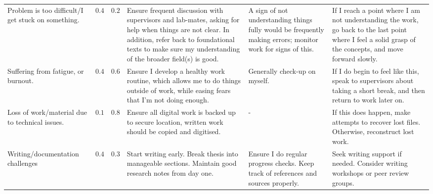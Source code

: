 \begin{table}[!ht]
\begin{tabularx}{\linewidth}{>{\justifying\arraybackslash}X>{\centering\arraybackslash}p{2cm}>{\centering\arraybackslash}p{2cm}>{\justifying\arraybackslash}X>{\justifying\arraybackslash}X>{\justifying\arraybackslash}X}
        Problem is too difficult/I get stuck on something.                                                                & $0.4$                & $0.2$           & Ensure frequent discussion with supervisors and lab-mates, asking for help when things are not clear. In addition, refer back to foundational texts to make sure my understanding of the broader field(s) is good. & A sign of not understanding things fully would be frequently making errors; monitor work for signs of this. & If I reach a point where I am not understanding the work, go back to the last point where I feel a solid grasp of the concepts, and move forward slowly.                             \\
        Suffering from fatigue, or burnout.                                                                               & $0.4$                & $0.6$           & Ensure I develop a healthy work routine, which allows me to do things outside of work, while easing fears that I'm not doing enough.                                                                               & Generally check-up on myself.                                                                               & If I do begin to feel like this, speak to supervisors about taking a short break, and then return to work later on.                                                                  \\
        Loss of work/material due to technical issues.                                                                    & $0.1$                & $0.8$           & Ensure all digital work is backed up to secure location, written work should be copied and digitised.                                                                                                              & -                                                                                                           & If this does happen, make attempts to recover lost files. Otherwise, reconstruct lost work.                                                                                          \\
        Writing/documentation challenges                                                                                  & $0.4$                & $0.3$           & Start writing early. Break thesis into manageable sections. Maintain good research notes from day one.                                                                                                             & Ensure I do regular progress checks. Keep track of references and sources properly.                         & Seek writing support if needed. Consider writing workshops or peer review groups.                                                                                                    \\
    \end{tabularx}
\end{table}

